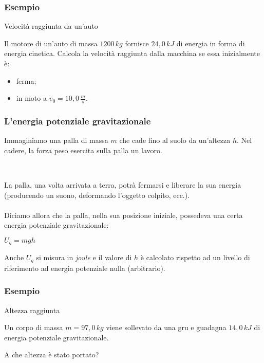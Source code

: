 \documentclass[]{beamer}
\theoremstyle{plain}
\begin{document}
\begin{frame}
  \frametitle{Esempio}
  \begin{exampleblock}{Velocità raggiunta da un'auto}
\begin{small}
Il motore di un'auto di massa $ 1200 \, kg $ fornisce $ 24,0 \, kJ $ di energia in forma di energia cinetica. Calcola la velocità raggiunta dalla macchina se essa inizialmente è:
\begin{itemize}
  \item ferma;
  \item in moto a $ v_0 = 10,0 \, \frac{m}{s} $.\pause
\end{itemize}
\end{small}
\end{exampleblock}
\end{frame}





\begin{frame}
  \frametitle{L'energia potenziale gravitazionale}
  Immaginiamo una palla di massa $ m $ che cade fino al suolo da un'altezza $ h $. Nel cadere, la forza peso esercita sulla palla un lavoro.\pause
  
  ~
  
  La palla, una volta arrivata a terra, potrà fermarsi e liberare la sua energia (producendo un suono, deformando l'oggetto colpito, ecc.).\\~\pause\\  
  Diciamo allora che la palla, nella sua posizione iniziale, possedeva una certa \alert{energia potenziale gravitazionale}:
  \begin{center}
\colorbox{blue!30}{$ U_g = mgh $}
\end{center}\pause
Anche $ U_g $ si misura in \emph{joule} e il valore di $ h $ è calcolato rispetto ad un livello di riferimento ad energia potenziale nulla (arbitrario).
\end{frame}



\begin{frame}
  \frametitle{Esempio}
  \begin{exampleblock}{Altezza raggiunta}
{\small Un corpo di massa $ m=97,0 \, kg $ viene sollevato da una gru e guadagna $ 14,0 \, kJ $ di energia potenziale gravitazionale.

A che altezza è stato portato?}
\end{exampleblock}
\end{frame}
\end{document}
